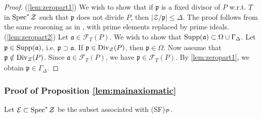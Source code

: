 \documentclass[11pt,a4paper,reqno]{amsart}
\theoremstyle{definition}
\begin{document}
\begin{proof}
(\ref{lem:zeropart1}) We wish to show that if $\mathfrak{p}$ is a fixed divisor of $P$ \hbox{w.r.t.} $\underline{T}$ in ${\rm Spec}^\ast\hskip 1pt \mathcal{Z}$ such that $\mathfrak{p}$ does not divide $P$, then $|\mathcal{Z}/\mathfrak{p}| \leq \Delta$. The proof follows from the same reasoning as in \cite[Lemma 3.1 (a)]{BDKN22}, with prime elements replaced by prime ideals.
\vskip 1mm
\noindent
(\ref{lem:zeropart2}) Let $\mathfrak{a} \in \mathscr{F}_{\underline{T}}(P)$. We wish to show that ${\rm Supp}(\mathfrak{a}) \subset \Omega \cup \Gamma_{\Delta}$. Let $\mathfrak{p} \in {\rm Supp}(\mathfrak{a})$, \hbox{i.e.} $\mathfrak{p} \supset \mathfrak{a}$. If $\mathfrak{p} \in {\rm Div}_{\mathcal{Z}}(P)$, then $\mathfrak{p} \in \Omega$. Now assume that $ \mathfrak{p} \notin {\rm Div}_{\mathcal{Z}}(P)$. Since $ \mathfrak{a} \in \mathscr{F}_{\underline{T}}(P)$, we have $\mathfrak{p} \in \mathscr{F}_{\underline{T}}(P)$. By \eqref{lem:zeropart1}, we obtain $\mathfrak{p} \in \Gamma_{\Delta}$.
\end{proof}

\subsubsection{Proof of Proposition \ref{lem:mainaxiomatic}}
Let $\mathcal{E} \subset {\rm Spec}^\ast \hskip 1pt \mathcal{Z}$ be the subset associated with (SF)$\null_{\mathcal P}$. 
\end{document}
